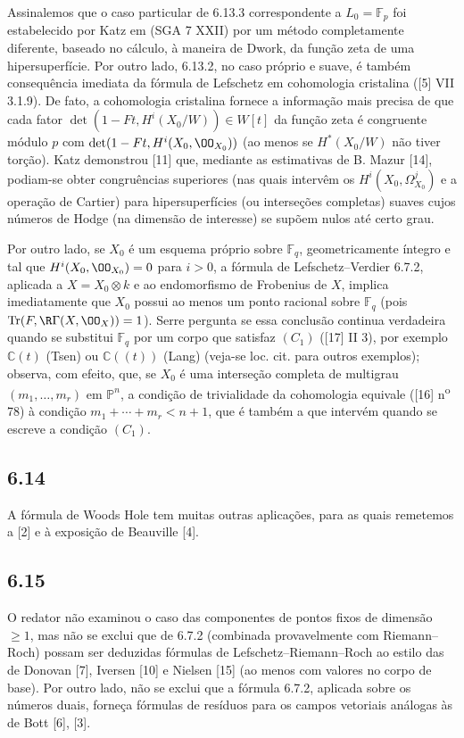 Assinalemos que o caso particular de 6.13.3 correspondente a $L_0=\mathbb F_p$ foi estabelecido por Katz em (SGA 7 XXII) por um método completamente diferente, baseado no cálculo, à maneira de Dwork, da função zeta de uma hipersuperfície. Por outro lado, 6.13.2, no caso próprio e suave, é também consequência imediata da fórmula de Lefschetz em cohomologia cristalina ([5] VII 3.1.9). De fato, a cohomologia cristalina fornece a informação mais precisa de que cada fator $\det(1-Ft,H^i(X_0/W))\in W[t]$ da função zeta é congruente módulo $p$ com $\det(1-Ft,H^i(X_0,\OO_{X_0}))$ (ao menos se $H^*(X_0/W)$ não tiver torção). Katz demonstrou [11] que, mediante as estimativas de B. Mazur [14], podiam-se obter congruências superiores (nas quais intervêm os $H^i(X_0,\Omega^j_{X_0})$ e a operação de Cartier) para hipersuperfícies (ou interseções completas) suaves cujos números de Hodge (na dimensão de interesse) se supõem nulos até certo grau.

Por outro lado, se $X_0$ é um esquema próprio sobre $\mathbb F_q$, geometricamente íntegro e tal que $H^i(X_0,\OO_{X_0})=0$ para $i>0$, a fórmula de Lefschetz--Verdier 6.7.2, aplicada a $X=X_0\otimes k$ e ao endomorfismo de Frobenius de $X$, implica imediatamente que $X_0$ possui ao menos um ponto racional sobre $\mathbb F_q$ (pois $\operatorname{Tr}(F,\R\Gamma(X,\OO_X))=1$). Serre pergunta se essa conclusão continua verdadeira quando se substitui $\mathbb F_q$ por um corpo que satisfaz $(C_1)$ ([17] II 3), por exemplo $\mathbb C(t)$ (Tsen) ou $\mathbb C((t))$ (Lang) (veja-se loc. cit. para outros exemplos); observa, com efeito, que, se $X_0$ é uma interseção completa de multigrau $(m_1,\ldots,m_r)$ em $\mathbb P^n$, a condição de trivialidade da cohomologia equivale ([16] n\textsuperscript{o} 78) à condição $m_1+\cdots+m_r<n+1$, que é também a que intervém quando se escreve a condição $(C_1)$.

\subsection*{6.14}
A fórmula de Woods Hole tem muitas outras aplicações, para as quais remetemos a [2] e à exposição de Beauville [4].


\subsection*{6.15}

O redator não examinou o caso das componentes de pontos fixos de dimensão $\geq1$, mas não se exclui que de 6.7.2 (combinada provavelmente com Riemann--Roch) possam ser deduzidas fórmulas de Lefschetz--Riemann--Roch ao estilo das de Donovan [7], Iversen [10] e Nielsen [15] (ao menos com valores no corpo de base). Por outro lado, não se exclui que a fórmula 6.7.2, aplicada sobre os números duais, forneça fórmulas de resíduos para os campos vetoriais análogas às de Bott [6], [3].
